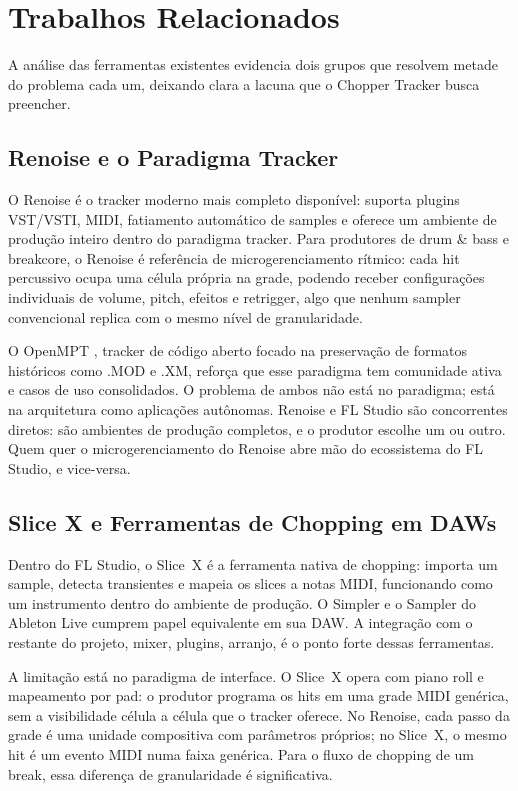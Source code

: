 \documentclass[portuguese]{sbc2025}
\begin{document}
\section{Trabalhos Relacionados}

A análise das ferramentas existentes evidencia dois grupos que resolvem metade do problema cada um, deixando clara a lacuna que o Chopper Tracker busca preencher.

\subsection{Renoise e o Paradigma Tracker}

O Renoise \citep{renoise} é o tracker moderno mais completo disponível: suporta plugins VST/VSTI, MIDI, fatiamento automático de samples e oferece um ambiente de produção inteiro dentro do paradigma tracker. Para produtores de drum \& bass e breakcore, o Renoise é referência de microgerenciamento rítmico: cada hit percussivo ocupa uma célula própria na grade, podendo receber configurações individuais de volume, pitch, efeitos e retrigger, algo que nenhum sampler convencional replica com o mesmo nível de granularidade.

O OpenMPT \citep{openmpt}, tracker de código aberto focado na preservação de formatos históricos como .MOD e .XM, reforça que esse paradigma tem comunidade ativa e casos de uso consolidados. O problema de ambos não está no paradigma; está na arquitetura como aplicações autônomas. Renoise e FL Studio são concorrentes diretos: são ambientes de produção completos, e o produtor escolhe um ou outro. Quem quer o microgerenciamento do Renoise abre mão do ecossistema do FL Studio, e vice-versa.

\subsection{Slice X e Ferramentas de Chopping em DAWs}

Dentro do FL Studio, o Slice~X é a ferramenta nativa de chopping: importa um sample, detecta transientes e mapeia os slices a notas MIDI, funcionando como um instrumento dentro do ambiente de produção. O Simpler e o Sampler do Ableton Live cumprem papel equivalente em sua DAW. A integração com o restante do projeto, mixer, plugins, arranjo, é o ponto forte dessas ferramentas.

A limitação está no paradigma de interface. O Slice~X opera com piano roll e mapeamento por pad: o produtor programa os hits em uma grade MIDI genérica, sem a visibilidade célula a célula que o tracker oferece. No Renoise, cada passo da grade é uma unidade compositiva com parâmetros próprios; no Slice~X, o mesmo hit é um evento MIDI numa faixa genérica. Para o fluxo de chopping de um break, essa diferença de granularidade é significativa.
\end{document}
